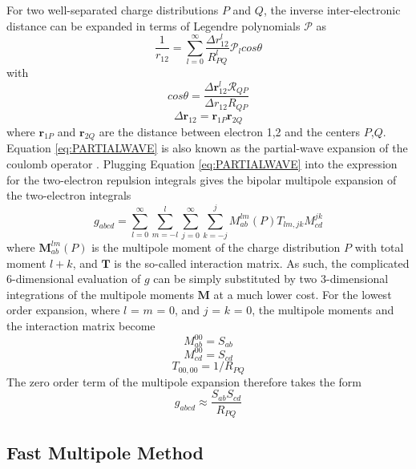 For two well-separated charge distributions $P$ and $Q$, the inverse inter-electronic distance can be expanded in terms of Legendre polynomials $\mathcal{P}$ as
\begin{equation}
\frac{1}{r_{12}} = \sum_{l=0}^{\infty} \frac{\Delta r_{12}^l}{R_{PQ}^l} \mathcal{P}_{l} cos \theta
\label{eq:PARTIALWAVE}
\end{equation}
\noindent with 
\begin{equation}
cos \theta = \frac{\Delta \mathbf{r}_{12}^l \mathcal{R}_{QP}}{\Delta r_{12} R_{QP}} 
\end{equation}
\begin{equation}
\Delta \mathbf{r}_{12} = \mathbf{r}_{1P} \mathbf{r}_{2Q}
\end{equation}
\noindent where $\mathbf{r}_{1P}$ and $\mathbf{r}_{2Q}$ are the distance between electron 1,2 and the centers $P$,$Q$. Equation \ref{eq:PARTIALWAVE} is also known as the partial-wave expansion of the coulomb operator \cite{Arf2012}. Plugging Equation \ref{eq:PARTIALWAVE} into the expression for the two-electron repulsion integrals gives the bipolar multipole expansion of the two-electron integrals
\begin{equation}
g_{abcd} = \sum_{l=0}^{\infty} \sum_{m=-l}^l \sum_{j=0}^{\infty} \sum_{k=-j}^{j} M_{ab}^{lm}(P) T_{lm,jk} M_{cd}^{jk}
\end{equation}
\noindent where $\mathbf{M}_{ab}^{lm}(P)$ is the multipole moment of the charge distribution $P$ with total moment $l+k$, and $\mathbf{T}$ is the so-called interaction matrix. As such, the complicated 6-dimensional evaluation of $g$ can be simply substituted by two 3-dimensional integrations of the multipole moments $\mathbf{M}$ at a much lower cost. For the lowest order expansion, where $l$ = $m$ = 0, and $j$ = $k$ = 0, the multipole moments and the interaction matrix become 
\begin{equation}
M_{ab}^{00} = S_{ab}
\end{equation}
\begin{equation}
M_{cd}^{00} = S_{cd}
\end{equation}
\begin{equation}
T_{00,00} = 1/R_{PQ}
\end{equation}
\noindent The zero order term of the multipole expansion therefore takes the form
\begin{equation}
g_{abcd} \approx \frac{S_{ab}S_{cd}}{R_{PQ}}
\end{equation}

\subsection{Fast Multipole Method}

